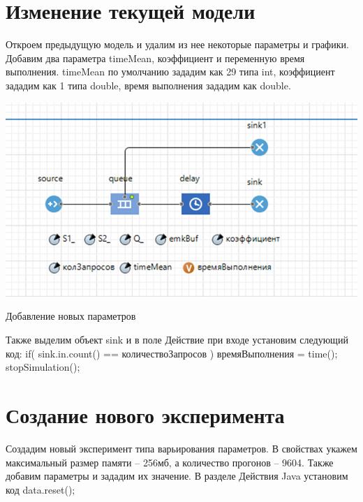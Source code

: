\graphicspath{{./ninth/img}} %

\section{Изменение текущей модели}
Откроем предыдущую модель и удалим из нее некоторые параметры и графики.
Добавим два параметра timeMean, коэффициент и переменную время выполнения.
timeMean по умолчанию зададим как 29 типа int, коэффициент зададим как 1 типа double, время выполнения зададим как double.

\begin{image}
	\includegraphics[width=1\textwidth]{img1}
	\caption{Добавление новых параметров}
	\label{fig:model}
\end{image}

Также выделим объект sink и в поле Действие при входе установим следующий код:
if( sink.in.count() == количествоЗапросов ){ времяВыполнения = time(); stopSimulation();}

\clearpage

\section{Создание нового эксперимента}
Создадим новый эксперимент типа варьирования параметров.
В свойствах укажем максимальный размер памяти – 256мб, а количество прогонов – 9604.
Также добавим параметры и зададим их значение. В разделе Действия Java установим код data.reset();

